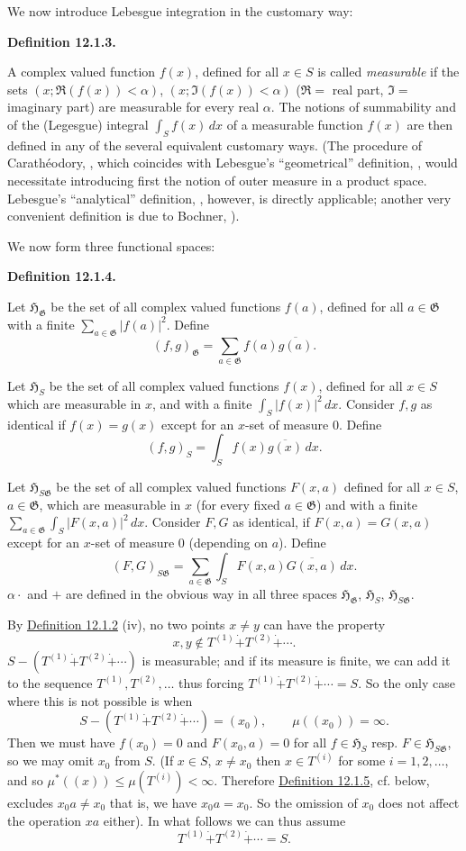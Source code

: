 \documentclass[12pt,b5paper,twoside]{article}
\newcommand{\Hspace}{\mathfrak H}
\newcommand{\Definition}[1]{%
  \par\smallskip\noindent\phantomsection\label{def:#1}\textbf{Definition #1.}\enspace
}
\newcommand{\defref}[1]{\hyperref[def:#1]{Definition #1}}
\begin{document}
We now introduce Lebesgue integration in the customary way:

\Definition{12.1.3}
A complex valued function $f(x)$, defined for all $x\in S$ is called
\emph{measurable} if the sets
$(x;\Re(f(x))<\alpha)$, $(x;\Im(f(x))<\alpha)$
($\Re=$ real part, $\Im=$ imaginary part) are measurable for every real
$\alpha$. The notions of summability and of the (Legesgue) integral
$\int_Sf(x)\,dx$ of a measurable function $f(x)$ are then defined in any of the
several equivalent customary ways. (The procedure of Carath\'eodory,
\cite[pp.~418--427]{ref4}, which coincides with Lebesgue's ``geometrical''
definition, \cite[pp.~116--120]{ref10}, would necessitate introducing first the
notion of outer measure in a product space. Lebesgue's ``analytical''
definition, \cite[pp.~112--116]{ref10}, however, is directly applicable;
another very convenient definition is due to Bochner,
\cite[pp.~265--267]{ref2}).

We now form three functional spaces:

\Definition{12.1.4}
Let $\Hspace_{\mathfrak G}$ be the set of all complex valued functions $f(a)$,
defined for all $a\in\mathfrak G$ with a finite
$\sum_{a\in\mathfrak G}|f(a)|^2$. Define
\[
 (f,g)_{\mathfrak G}=\sum_{a\in\mathfrak G}f(a)\overline{g(a)}.
\]

Let $\Hspace_S$ be the set of all complex valued functions $f(x)$, defined for
all $x\in S$ which are measurable in $x$, and with a finite
$\int_S|f(x)|^2\,dx$. Consider $f,g$ as identical if $f(x)=g(x)$ except for an
$x$-set of measure $0$. Define
\[
 (f,g)_S=\int_S f(x)\overline{g(x)}\,dx.
\]

Let $\Hspace_{S\mathfrak G}$ be the set of all complex valued functions
$F(x,a)$ defined for all $x\in S$, $a\in\mathfrak G$, which are measurable in
$x$ (for every fixed $a\in\mathfrak G$) and with a finite
$\sum_{a\in\mathfrak G}\int_S|F(x,a)|^2\,dx$. Consider $F,G$ as identical,
if $F(x,a)=G(x,a)$ except for an $x$-set of measure $0$ (depending on $a$).
Define
\[
 (F,G)_{S\mathfrak G}
 =\sum_{a\in\mathfrak G}\int_SF(x,a)\overline{G(x,a)}\,dx.
\]
$\alpha\cdot$ and $+$ are defined in the obvious way in all three spaces
$\Hspace_{\mathfrak G}$, $\Hspace_S$, $\Hspace_{S\mathfrak G}$.

By \defref{12.1.2} (iv), no two points $x\neq y$ can have the property
\[
 x,y\notin T^{(1)}\mathbin{\dot+}T^{(2)}\mathbin{\dot+}\cdots.
\]
$S-(T^{(1)}\mathbin{\dot+}T^{(2)}\mathbin{\dot+}\cdots)$ is measurable; and
if its measure is finite, we can add it to the sequence
$T^{(1)},T^{(2)},\ldots$ thus forcing
$T^{(1)}\mathbin{\dot+}T^{(2)}\mathbin{\dot+}\cdots=S$. So the only case
where this is not possible is when
\[
 S-(T^{(1)}\mathbin{\dot+}T^{(2)}\mathbin{\dot+}\cdots)=(x_0),
 \qquad \mu((x_0))=\infty.
\]
Then we must have $f(x_0)=0$ and $F(x_0,a)=0$ for all
$f\in\Hspace_S$ resp. $F\in\Hspace_{S\mathfrak G}$, so we may omit $x_0$
from $S$. (If $x\in S$, $x\neq x_0$ then $x\in T^{(i)}$ for some
$i=1,2,\ldots$, and so $\mu^*((x))\leq\mu(T^{(i)})<\infty$. Therefore
\defref{12.1.5}, cf. below, excludes $x_0a\neq x_0$ that is, we have
$x_0a=x_0$. So the omission of $x_0$ does not affect the operation $xa$
either). In what follows we can thus assume
\[
 T^{(1)}\mathbin{\dot+}T^{(2)}\mathbin{\dot+}\cdots=S.
\]
\end{document}
